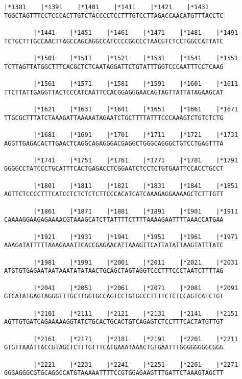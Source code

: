 \documentclass{article}
\begin{document}
\newpage
\begin{Verbatim}[fontfamily=courier]
        |*1381    |*1391    |*1401    |*1411    |*1421    |*1431
TGGCTAGTTTCCTCCCACTTGTCTACCCCTCCTTTGTCCTTAGACCAACATGTTTACCTC

        |*1441    |*1451    |*1461    |*1471    |*1481    |*1491
TCTGCTTTGCCAACTTAGCCAGCAGGCCATCCCCGGCCCTAACGTCTCCTGGCCATTATC

        |*1501    |*1511    |*1521    |*1531    |*1541    |*1551
TCTTAGTTATGGCTTTCACGCTCTCAATAGGATTCTGTATTTGGTCCCAATTTCCTCAAG

        |*1561    |*1571    |*1581    |*1591    |*1601    |*1611
TTCTTATTGAGGTTACTCCCATCAATTCCACGGAGGGAACAGTAGTTATTATAGAAGCAT

        |*1621    |*1631    |*1641    |*1651    |*1661    |*1671
TTGCGCTTTATCTAAAGATTAAAAATAGAATCTGCTTTTATTTCCCAAAGTCTGTCTCTG

        |*1681    |*1691    |*1701    |*1711    |*1721    |*1731
AGGTTGAGACACTTGAACTCAGGCAGAGGGACGAGGCTGGGCAGGGCTGTCCTGAGTTTA

        |*1741    |*1751    |*1761    |*1771    |*1781    |*1791
GGGGCCTATCCCTGCATTTCACTGAGACCTCGGAATCTCCTCTGTGAATTCCACCTGCCT

        |*1801    |*1811    |*1821    |*1831    |*1841    |*1851
AGTTCTCCCCTTTCATCCTCTCTCTCTTCCCACATCATCAAAGAGGAAAAGCTCTTTGTT

        |*1861    |*1871    |*1881    |*1891    |*1901    |*1911
CAAAAGGAAGAGAAAACGTAAAGCATCTTATTTTCTTTTAAAAGAATTTTAAACCATGAA

        |*1921    |*1931    |*1941    |*1951    |*1961    |*1971
AAAGATATTTTTAAAGAAATTCACCGAGAACATTAAAGTTCATTATATTAAGTATTTATC

        |*1981    |*1991    |*2001    |*2011    |*2021    |*2031
ATGTGTGAGAATAATAAATATATAACTGCAGCTAGTAGGTCCCTTTCCCTAATCTTTTAG

        |*2041    |*2051    |*2061    |*2071    |*2081    |*2091
GTCATATGAGTAGGGTTTGCTTGGTGCCAGTCCTGTGCCCTTTTCTCTCCAGTCATCTGT

        |*2101    |*2111    |*2121    |*2131    |*2141    |*2151
AGTTGTGATCAGAAAAAGGTATCTGCACTGCACTGTCAGAGTCTCCTTTCACTATGTTGT

        |*2161    |*2171    |*2181    |*2191    |*2201    |*2211
GTGTTAAATTACCGTAGCTCTTTGTTTCATGAAATAAACTGTGAATTTGGGGGGGGCGGG

        |*2221    |*2231    |*2241    |*2251    |*2261    |*2271
GGGAGGGCGTGCAGGCCATGTAAAAATTTTCCGTGGAGAAGTTTGATTCTAAAGTAGCTT

\end{Verbatim}
\end{document}

